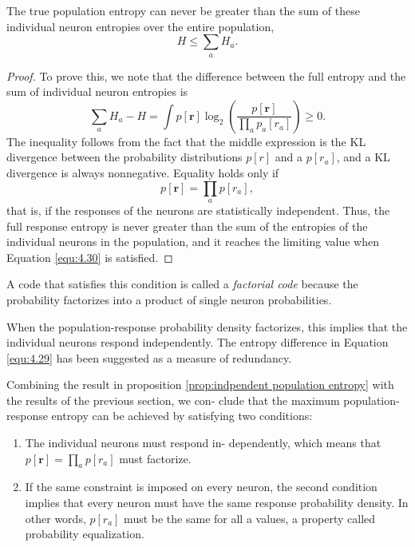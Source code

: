 \begin{prop}
  \label{prop:indpendent population entropy}
  The true population entropy can never be greater than the sum of these
  individual neuron entropies over the entire population,
  \begin{equation}
    \label{equ:4.28}
    H\leq \sum\limits_{a}{H_a}.
  \end{equation}
  \begin{proof}
    To prove this, we note that the difference between the full entropy and the
    sum of individual neuron entropies is
    \begin{equation*}
      \label{equ:4.29}
      \sum\limits_{a}H_a-H=\int{p[\mathbf{r}]\log_2\left(\frac{p[\mathbf{r}]}{\prod_ap_a[r_a]}\right)\geq0}.
    \end{equation*}
    The inequality follows from the fact that the middle expression is the KL
divergence between the probability distributions $p[r]$ and a $p[r_a]$, and a
KL divergence is always nonnegative. Equality holds only if
\begin{equation}
  \label{equ:4.30}
  p[\mathbf{r}]=\prod_ap[r_a],
\end{equation}
that is, if the responses of the neurons are statistically independent. Thus,
the full response entropy is never greater than the sum of the entropies of
the individual neurons in the population, and it reaches the limiting value
when Equation \ref{equ:4.30} is satisfied.
  \end{proof}
\end{prop}

\begin{defn}
  \label{defn:factorial code}
  A code that satisfies this condition is called
a \emph{factorial code} because the probability factorizes into a product of single
neuron probabilities.
\end{defn}

\begin{rem}
  When the population-response probability density
factorizes, this implies that the individual neurons respond independently.
The entropy difference in Equation \ref{equ:4.29} has been suggested as a measure
of redundancy.
\end{rem}
\begin{prop}
  Combining the result in proposition \ref{prop:indpendent population entropy} with the results of the previous section, we con-
clude that the maximum population-response entropy can be achieved by
satisfying two conditions:
\begin{enumerate}
\item The individual neurons must respond in-
dependently, which means that $ p[\mathbf{r}]=\prod_ap[r_a]$ must
factorize.
\item If the same
constraint is imposed on every neuron, the second condition implies that
every neuron must have the same response probability density. In other
words, $p[r_a]$ must be the same for all a values, a property called probability
equalization.
\end{enumerate}
\end{prop}

